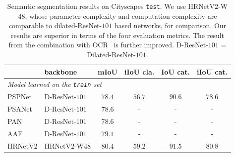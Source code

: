 \documentclass[10pt,journal,compsoc]{IEEEtran}
\begin{document}
	\renewcommand{\arraystretch}{1.3}
	\setlength{\tabcolsep}{3pt}
	\begin{table}[t]
		\scriptsize
		\centering 
		\caption{Semantic segmentation results on Cityscapes \texttt{test}. 
		{We use HRNetV$2$-W$48$,
		whose parameter complexity and computation complexity are comparable to dilated-ResNet-$101$ based networks,
		for comparison. 
		Our results are superior
		in terms of the four evaluation metrics.
		The result
		from the combination with OCR~\cite{YuanCW18}
		is further improved.} D-ResNet-$101$ = Dilated-ResNet-$101$.}
		\label{tab:cityscaperesults}
		\vspace{-3mm}
		\begin{tabular}{l|l|cccc}
			\hline%
			  & backbone & mIoU  & iIoU cla. & IoU cat. & iIoU cat.\\
			\hline
			
			\hline
			\multicolumn{3}{l}{\emph {Model learned on the \texttt{train} set}}\\
			\hline
			PSPNet~\cite{ZhaoSQWJ17} & D-ResNet-$101$ & $78.4$ & $56.7$ & $90.6$  & $78.6$ \\
			PSANet~\cite{ZhaoZLSLLJ18} & D-ResNet-$101$ & $78.6$ & - & - & - \\
			PAN~\cite{LiXAW18} & D-ResNet-$101$ & $78.6$ & - & - & - \\
			AAF~\cite{KeHLY18} & D-ResNet-$101$ & $79.1$ & - & - & -\\
			\hline
			HRNetV$2$ & HRNetV$2$-W$48$ & $\mathbf{80.4}$ & $\mathbf{59.2}$ & $\mathbf{91.5}$ & $\mathbf{80.8}$\\
			\hline
			

\end{tabular}
\end{table}
\end{document}
